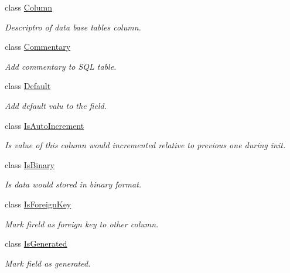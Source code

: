\begin{DoxyCompactItemize}
\item 
class \mbox{\hyperlink{class_uniform_data_operator_1_1_sql_1_1_attributes_1_1_column}{Column}}
\begin{DoxyCompactList}\small\item\em Descriptro of data base table\textquotesingle{}s column. \end{DoxyCompactList}\item 
class \mbox{\hyperlink{class_uniform_data_operator_1_1_sql_1_1_attributes_1_1_commentary}{Commentary}}
\begin{DoxyCompactList}\small\item\em Add commentary to S\+QL table. \end{DoxyCompactList}\item 
class \mbox{\hyperlink{class_uniform_data_operator_1_1_sql_1_1_attributes_1_1_default}{Default}}
\begin{DoxyCompactList}\small\item\em Add default valu to the field. \end{DoxyCompactList}\item 
class \mbox{\hyperlink{class_uniform_data_operator_1_1_sql_1_1_attributes_1_1_is_auto_increment}{Is\+Auto\+Increment}}
\begin{DoxyCompactList}\small\item\em Is value of this column would incremented relative to previous one during init. \end{DoxyCompactList}\item 
class \mbox{\hyperlink{class_uniform_data_operator_1_1_sql_1_1_attributes_1_1_is_binary}{Is\+Binary}}
\begin{DoxyCompactList}\small\item\em Is data would stored in binary format. \end{DoxyCompactList}\item 
class \mbox{\hyperlink{class_uniform_data_operator_1_1_sql_1_1_attributes_1_1_is_foreign_key}{Is\+Foreign\+Key}}
\begin{DoxyCompactList}\small\item\em Mark fireld as foreign key to other column. \end{DoxyCompactList}\item 
class \mbox{\hyperlink{class_uniform_data_operator_1_1_sql_1_1_attributes_1_1_is_generated}{Is\+Generated}}
\begin{DoxyCompactList}\small\item\em Mark field as generated. \end{DoxyCompactList}\item 

\end{DoxyCompactItemize}
